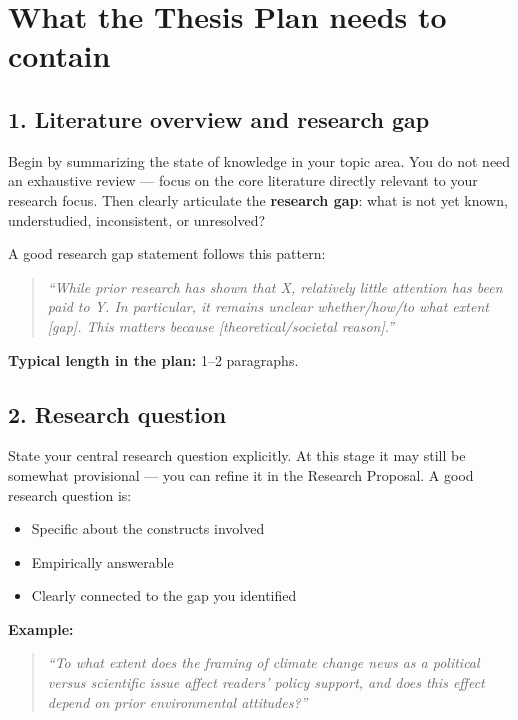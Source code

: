 \documentclass[
  11pt,
  a4paper,
]{scrbook}
\providecommand{\tightlist}{%
  \setlength{\itemsep}{0pt}\setlength{\parskip}{0pt}}\usepackage{longtable,booktabs,array}
\begin{document}
\section{What the Thesis Plan needs to
contain}\label{what-the-thesis-plan-needs-to-contain}

\subsection{1. Literature overview and research
gap}\label{literature-overview-and-research-gap}

Begin by summarizing the state of knowledge in your topic area. You do
not need an exhaustive review --- focus on the core literature directly
relevant to your research focus. Then clearly articulate the
\textbf{research gap}: what is not yet known, understudied,
inconsistent, or unresolved?

A good research gap statement follows this pattern:

\begin{quote}
\emph{``While prior research has shown that X, relatively little
attention has been paid to Y. In particular, it remains unclear
whether/how/to what extent {[}gap{]}. This matters because
{[}theoretical/societal reason{]}.''}
\end{quote}

\textbf{Typical length in the plan:} 1--2 paragraphs.

\subsection{2. Research question}\label{research-question}

State your central research question explicitly. At this stage it may
still be somewhat provisional --- you can refine it in the Research
Proposal. A good research question is:

\begin{itemize}
\tightlist
\item
  Specific about the constructs involved
\item
  Empirically answerable
\item
  Clearly connected to the gap you identified
\end{itemize}

\textbf{Example:}

\begin{quote}
\emph{``To what extent does the framing of climate change news as a
political versus scientific issue affect readers' policy support, and
does this effect depend on prior environmental attitudes?''}
\end{quote}
\end{document}
